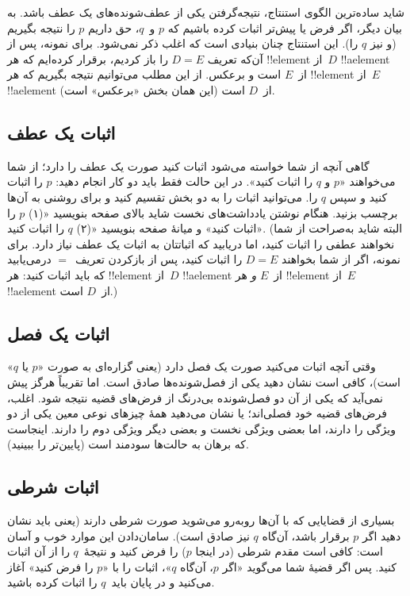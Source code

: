 \documentclass[../../../include/open-logic-section]{subfiles}
\begin{document}
شاید ساده‌ترین الگوی استنتاج، نتیجه‌گرفتن یکی از عطف‌شونده‌های یک
عطف باشد. به بیان دیگر، اگر فرض یا پیش‌تر اثبات کرده باشیم که $p$
و~$q$، حق داریم $p$ را نتیجه بگیریم (و نیز $q$ را). این استنتاج
چنان بنیادی است که اغلب ذکر نمی‌شود. برای نمونه، پس از آن‌که تعریف
$D = E$ را باز کردیم، برقرار کرده‌ایم که هر !!{element} از~$D$
!!a{element} از~$E$ است و برعکس. از این مطلب می‌توانیم نتیجه بگیریم
که هر !!{element} از~$E$ !!a{element} از~$D$ است (این همان بخش
«برعکس» است).

\subsection{اثبات یک عطف}

گاهی آنچه از شما خواسته می‌شود اثبات کنید صورت یک عطف را دارد؛ از
شما می‌خواهند «$p$ و $q$ را اثبات کنید». در این حالت فقط باید دو
کار انجام دهید: $p$ را اثبات کنید و سپس $q$ را. می‌توانید اثبات را
به دو بخش تقسیم کنید و برای روشنی به آن‌ها برچسب بزنید. هنگام
نوشتن یادداشت‌های نخست شاید بالای صفحه بنویسید «(۱) $p$ را اثبات
کنید» و میانهٔ صفحه بنویسید «(۲) $q$ را اثبات کنید». (البته شاید
به‌صراحت از شما نخواهند عطفی را اثبات کنید، اما دریابید که اثباتتان
به اثبات یک عطف نیاز دارد. برای نمونه، اگر از شما بخواهند
$D = E$ را اثبات کنید، پس از بازکردن تعریف~$=$ درمی‌یابید که باید
اثبات کنید: هر !!{element} از~$D$ !!a{element} از~$E$
\emph{و} هر !!{element} از~$E$ !!a{element} از~$D$ است.)

\subsection{اثبات یک فصل}

وقتی آنچه اثبات می‌کنید صورت یک فصل دارد (یعنی گزاره‌ای به صورت
«$p$ یا $q$» است)، کافی است نشان دهید یکی از فصل‌شونده‌ها صادق است.
اما تقریباً هرگز پیش نمی‌آید که یکی از آن دو فصل‌شونده بی‌درنگ از
فرض‌های قضیه نتیجه شود. اغلب، فرض‌های قضیه خود فصلی‌اند؛ یا نشان
می‌دهید همهٔ چیزهای نوعی معین یکی از دو ویژگی را دارند، اما بعضی
ویژگی نخست و بعضی دیگر ویژگی دوم را دارند. اینجاست که برهان به
حالت‌ها سودمند است (پایین‌تر را ببینید).

\subsection{اثبات شرطی}

بسیاری از قضایایی که با آن‌ها روبه‌رو می‌شوید صورت شرطی دارند (یعنی
باید نشان دهید اگر $p$ برقرار باشد، آن‌گاه $q$ نیز صادق است).
سامان‌دادن این موارد خوب و آسان است: کافی است مقدم شرطی (در اینجا
$p$) را فرض کنید و نتیجهٔ~$q$ را از آن اثبات کنید. پس اگر قضیهٔ شما
می‌گوید «اگر $p$، آن‌گاه $q$»، اثبات را با «$p$ را فرض کنید» آغاز
می‌کنید و در پایان باید~$q$ را اثبات کرده باشید.
\end{document}
